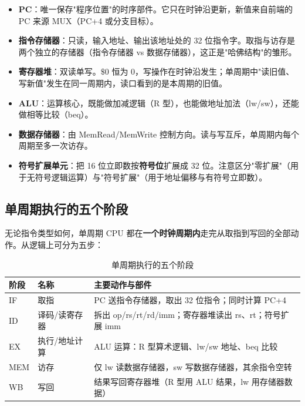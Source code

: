 \begin{itemize}
    \item \textbf{PC}：唯一保存"程序位置"的时序部件。它只在时钟沿更新，新值来自前端的 PC 来源 MUX（PC+4 或分支目标）。
    \item \textbf{指令存储器}：只读，输入地址、输出该地址处的 32 位指令字。取指与访存是两个独立的存储器（指令存储器 vs 数据存储器），这正是"哈佛结构"的雏形。
    \item \textbf{寄存器堆}：双读单写。$\$0$ 恒为 0，写操作在时钟沿发生；单周期中"读旧值、写新值"发生在同一周期内，读口看到的是本周期的旧值。
    \item \textbf{ALU}：运算核心，既能做加减逻辑（R 型），也能做地址加法（lw/sw），还能做相等比较（beq）。
    \item \textbf{数据存储器}：由 MemRead/MemWrite 控制方向。读与写互斥，单周期内每个周期至多一次访存。
    \item \textbf{符号扩展单元}：把 16 位立即数按\textbf{符号位}扩展成 32 位。注意区分"零扩展"（用于无符号逻辑运算）与"符号扩展"（用于地址偏移与有符号立即数）。
\end{itemize}

\subsection{单周期执行的五个阶段}

无论指令类型如何，单周期 CPU 都在\textbf{一个时钟周期内}走完从取指到写回的全部动作。从逻辑上可分为五步：

\begin{table}[H]
\centering
\caption{单周期执行的五个阶段}
\label{tab:five_stages}
\begin{tabulary}{\textwidth}{LLL}
\toprule
\textbf{阶段} & \textbf{名称} & \textbf{主要动作与部件} \\
\midrule
IF & 取指 & PC 送指令存储器，取出 32 位指令；同时计算 PC+4 \\
ID & 译码/读寄存器 & 拆出 op/rs/rt/rd/imm；寄存器堆读出 rs、rt；符号扩展 imm \\
EX & 执行/地址计算 & ALU 运算：R 型算术逻辑、lw/sw 地址、beq 比较 \\
MEM & 访存 & 仅 lw 读数据存储器，sw 写数据存储器，其余指令空转 \\
WB & 写回 & 结果写回寄存器堆（R 型用 ALU 结果，lw 用存储器数据） \\
\bottomrule
\end{tabulary}
\end{table}


